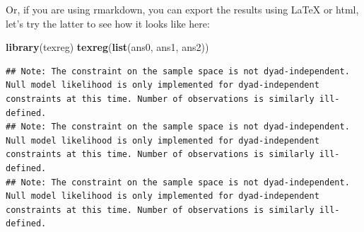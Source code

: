 \documentclass[]{book}
\newenvironment{Shaded}{\begin{snugshade}}{\end{snugshade}}
\newcommand{\KeywordTok}[1]{\textcolor[rgb]{0.13,0.29,0.53}{\textbf{#1}}}
\newcommand{\NormalTok}[1]{#1}
\theoremstyle{definition}
\theoremstyle{definition}
\theoremstyle{definition}
\theoremstyle{remark}
\begin{document}
Or, if you are using rmarkdown, you can export the results using LaTeX
or html, let's try the latter to see how it looks like here:

\begin{Shaded}
\begin{Highlighting}[]
\KeywordTok{library}\NormalTok{(texreg)}
\KeywordTok{texreg}\NormalTok{(}\KeywordTok{list}\NormalTok{(ans0, ans1, ans2))}
\end{Highlighting}
\end{Shaded}

\begin{verbatim}
## Note: The constraint on the sample space is not dyad-independent. Null model likelihood is only implemented for dyad-independent constraints at this time. Number of observations is similarly ill-defined.
## Note: The constraint on the sample space is not dyad-independent. Null model likelihood is only implemented for dyad-independent constraints at this time. Number of observations is similarly ill-defined.
## Note: The constraint on the sample space is not dyad-independent. Null model likelihood is only implemented for dyad-independent constraints at this time. Number of observations is similarly ill-defined.
\end{verbatim}
\end{document}
